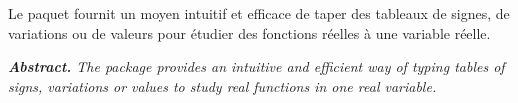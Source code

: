 \documentclass[12pt, a4paper]{article}
\begin{document}
\noindent
Le paquet  fournit un moyen intuitif et efficace de taper des tableaux de signes, de variations ou de valeurs pour étudier des fonctions réelles à une variable réelle.




\tdocsep

{\noindent
\small\itshape
\textbf{Abstract.}
The  package provides an intuitive and efficient way of typing tables of signs, variations or values to study real functions in one real variable.
}
\end{document}
